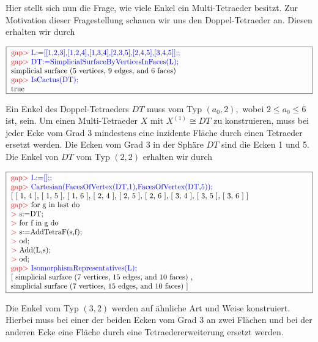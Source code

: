 \documentclass[12pt,titlepage,twoside,cleardoublepage]{article}
\theoremstyle{nummermitklammern}
\numberwithin{equation}{section}
\begin{document}
Hier stellt sich nun die Frage, wie viele Enkel ein Multi-Tetraeder besitzt. 
Zur Motivation dieser Fragestellung schauen wir uns den Doppel-Tetraeder an.
Diesen erhalten wir durch
\begin{center}
 $\fbox{
\parbox{14cm}{
\textcolor{red}{gap$>$} \textcolor{blue}{L:=[[1,2,3],[1,2,4],[1,3,4],[2,3,5],[2,4,5],[3,4,5]];;}\newline
\textcolor{red}{gap$>$} \textcolor{blue}{DT:=SimplicialSurfaceByVerticesInFaces(L);}\newline
simplicial surface (5 vertices, 9 edges, and 6 faces)\newline
\textcolor{red}{gap$>$} \textcolor{blue}{IsCactus(DT);}\newline
true
}}$
\end{center}
Ein Enkel des Doppel-Tetraeders $DT$ muss vom Typ $(a_0,2),$ wobei $2\leq a_0 \leq 6$ ist, sein.
Um einen Multi-Tetraeder $X$ mit $X^{(1)}\cong DT$ zu konstruieren, muss bei jeder Ecke vom Grad 3 mindestens eine inzidente Fläche durch einen Tetraeder ersetzt werden. Die Ecken vom Grad 3 in der Sphäre $DT$ sind die Ecken 1 und 5. 
Die Enkel von $DT$ vom Typ $(2,2)$ erhalten wir durch
\begin{center}
 $\fbox{
\parbox{14cm}{
\textcolor{red}{gap$>$} \textcolor{blue}{L:=[];;}\newline
\textcolor{red}{gap$>$} \textcolor{blue}{Cartesian(FacesOfVertex(DT,1),FacesOfVertex(DT,5));}\newline
[ [ 1, 4 ], [ 1, 5 ], [ 1, 6 ], [ 2, 4 ], [ 2, 5 ], [ 2, 6 ], [ 3, 4 ],
  [ 3, 5 ], [ 3, 6 ] ]\newline
\textcolor{red}{gap$>$} for g in last do\newline
\textcolor{red}{$>$} s:=DT;\newline
\textcolor{red}{$>$} for f in g do\newline
\textcolor{red}{$>$} s:=AddTetraF(s,f);\newline
\textcolor{red}{$>$} od;\newline
\textcolor{red}{$>$} Add(L,s);\newline
\textcolor{red}{$>$} od;\newline
\textcolor{red}{gap$>$} \textcolor{blue}{IsomorphismRepresentatives(L);}\newline
[ simplicial surface (7 vertices, 15 edges, and 10 faces)
    ,\newline
  simplicial surface (7 vertices, 15 edges, and 10 faces)
 ]
 }}$
 \end{center}
 Die Enkel vom Typ $(3,2)$ werden auf ähnliche Art und Weise konstruiert. Hierbei muss bei einer der beiden Ecken vom Grad 3 an zwei Flächen und bei der anderen Ecke eine Fläche durch eine Tetraedererweiterung ersetzt werden.
\end{document}
